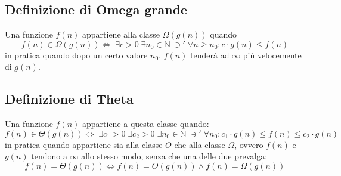 \documentclass[italian]{article}
\newcommand{\ins}[1]{\text{$\mathbb{#1}$}}
\newcommand{\taleche}{\;\ni'\;}
\newcommand{\varOmegaClass}{\varOmega(g(n))}
\newcommand{\varOmicron}{O}
\newcommand{\fn}{f(n)}
\newcommand{\gn}{g(n)}
\let\oldexists\exists
\renewcommand{\exists}{\text{$\;\oldexists$}}
\begin{document}
\subsection{Definizione di Omega grande}
Una funzione $f(n)$ appartiene alla classe $\varOmegaClass$ quando
\[
	f(n) \in \varOmega\left(g(n)\right) \iff \exists c>0 \exists n_0 \in \ins{N} \taleche \forall n \geq n_0 : c\cdot g(n) \leq f(n)
\]
in pratica quando dopo un certo valore $n_0$, $\fn$ tenderà ad $\infty$ più velocemente di $\gn$.
\subsection{Definizione di Theta}
Una funzione $f(n)$ appartiene a questa classe quando:
\[
	f(n) \in \varTheta\left(g(n)\right) \iff \exists c_1 > 0 \exists c_2 > 0 \exists n_0 \in \ins{N} \taleche \forall n_0 : c_1 \cdot g(n) \leq f(n) \leq c_2 \cdot g(n) 
\]
in pratica quando appartiene sia alla classe $\varOmicron$ che alla classe $\varOmega$, ovvero $\fn$ e $\gn$ tendono a $\infty$ allo stesso modo, senza che una delle due prevalga:
\[
	f(n) = \varTheta\left(g(n)\right) \iff f(n) = \varOmicron(g(n)) \land f(n) = \varOmega(g(n))
\]
\nopagebreak
\end{document}
